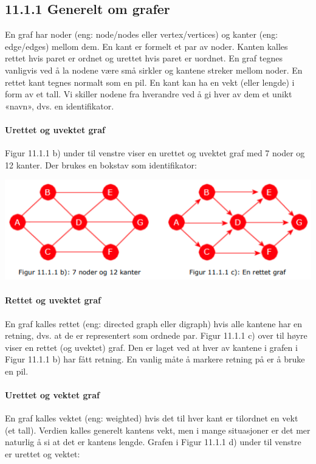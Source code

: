 \documentclass[11pt]{article}
\begin{document}
    \subsection{11.1.1 Generelt om grafer}
        En graf har noder (eng: node/nodes eller vertex/vertices) og kanter (eng: edge/edges)
        mellom dem. En kant er formelt et par av noder. Kanten kalles rettet hvis paret er ordnet
        og urettet hvis paret er uordnet. En graf tegnes vanligvis ved å la nodene være små sirkler
        og kantene streker mellom noder. En rettet kant tegnes normalt som en pil. En kant kan ha
        en vekt (eller lengde) i form av et tall. Vi skiller nodene fra hverandre ved å gi hver av dem
        et unikt «navn», dvs. en identifikator.

        \paragraph{Urettet og uvektet graf} Figur 11.1.1 b) under til venstre viser en urettet og uvektet graf
        med 7 noder og 12 kanter. Der brukes en bokstav som identifikator:

        \includegraphics[center]{f-11.1.1bc.png}

        \paragraph{Rettet og uvektet graf} En graf kalles rettet (eng: directed graph eller digraph) hvis alle
        kantene har en retning, dvs. at de er representert som ordnede par. Figur 11.1.1 c) over til
        høyre viser en rettet (og uvektet) graf. Den er laget ved at hver av kantene i grafen i Figur
        11.1.1 b) har fått retning. En vanlig måte å markere retning på er å bruke en pil.

        \paragraph{Urettet og vektet graf} En graf kalles vektet (eng: weighted) hvis det til hver kant er
        tilordnet en vekt (et tall). Verdien kalles generelt kantens vekt, men i mange situasjoner er
        det mer naturlig å si at det er kantens lengde. Grafen i Figur 11.1.1 d) under til venstre er
        urettet og vektet:
\end{document}
